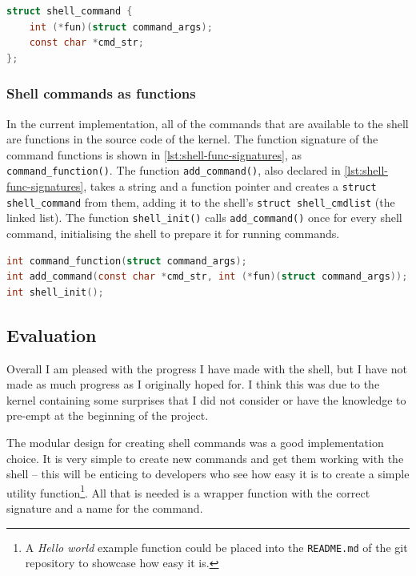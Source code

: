 \documentclass{article}
\begin{document}
\begin{lstlisting}[language=C, caption={The definition of the
                   \texttt{shell\_command} struct}, float,
                   label={lst:struct-shell-command}]
struct shell_command {
    int (*fun)(struct command_args);
    const char *cmd_str;
};
\end{lstlisting}

\subsubsection{Shell commands as functions}
In the current implementation, all of the commands that are available to the
shell are functions in the source code of the kernel. The function signature of
the command functions is shown in \autoref{lst:shell-func-signatures}, as
\verb!command_function()!. The function \verb!add_command()!, also declared in
\autoref{lst:shell-func-signatures}, takes a string and a function pointer and
creates a \verb!struct shell_command! from them, adding it to the shell's
\verb!struct shell_cmdlist! (the linked list). The function \verb!shell_init()!
calls \verb!add_command()! once for every shell command, initialising the shell
to prepare it for running commands.

\begin{lstlisting}[language=C, caption={The signatures of some important
                   functions for the shell}, float,
                   label={lst:shell-func-signatures}]
int command_function(struct command_args);
int add_command(const char *cmd_str, int (*fun)(struct command_args));
int shell_init();
\end{lstlisting}

\subsection{Evaluation}
Overall I am pleased with the progress I have made with the shell, but I have
not made as much progress as I originally hoped for. I think this was due to
the kernel containing some surprises that I did not consider or have the
knowledge to pre-empt at the beginning of the project.

The modular design for creating shell commands was a good implementation
choice. It is very simple to create new commands and get them working with the
shell -- this will be enticing to developers who see how easy it is to create a
simple utility function\footnote{A \emph{Hello world} example function could be
placed into the \texttt{README.md} of the git repository to showcase how easy
it is.}. All that is needed is a wrapper function with the correct signature
and a name for the command.
\end{document}
